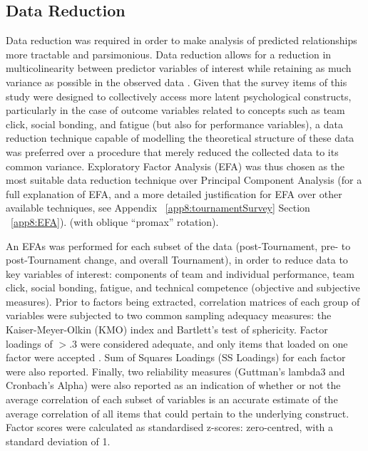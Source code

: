 \begin{CJK}{UTF8}{gbsn}
\subsection{\label{Ch5:dataReduction}Data Reduction}
Data reduction was required in order to make analysis of predicted relationships more tractable and parsimonious. Data reduction allows for a reduction in multicolinearity between predictor variables of interest while retaining as much variance as possible in the observed data \citep{Yong2013}.  Given that the survey items of this study were designed to collectively access more latent psychological constructs, particularly in the case of outcome variables related to concepts such as team click, social bonding, and fatigue (but also for performance variables), a data reduction technique capable of modelling the theoretical structure of these data was preferred over a procedure that merely reduced the collected data to its common variance.  Exploratory Factor Analysis (EFA) was thus chosen as the most suitable data reduction technique over Principal Component Analysis (for a full explanation of EFA, and a more detailed justification for EFA over other available techniques, see Appendix ~\ref{app8:tournamentSurvey} Section ~\ref{app8:EFA}).  (with oblique ``promax'' rotation).

An EFAs was performed for each subset of the data (post-Tournament, pre- to post-Tournament change, and overall Tournament), in order to reduce data to key variables of interest: components of team and individual performance, team click, social bonding, fatigue, and technical competence (objective and subjective measures). Prior to factors being extracted, correlation matrices of each group of variables were subjected to two common sampling adequacy measures: the Kaiser-Meyer-Olkin (KMO) index and Bartlett’s test of sphericity.  Factor loadings of $> .3$ were considered adequate, and only items that loaded on one factor were accepted \citep{Field2012}. Sum of Squares Loadings (SS Loadings) for each factor were also reported\citep{Dziuban1974}.  Finally, two reliability measures (Guttman's lambda3 and Cronbach's Alpha) were also reported as an indication of whether or not the average correlation of each subset of variables is an accurate estimate of the average correlation of all items that could pertain to the underlying construct.  Factor scores were calculated as standardised z-scores: zero-centred, with a standard deviation of 1.


\end{CJK}
